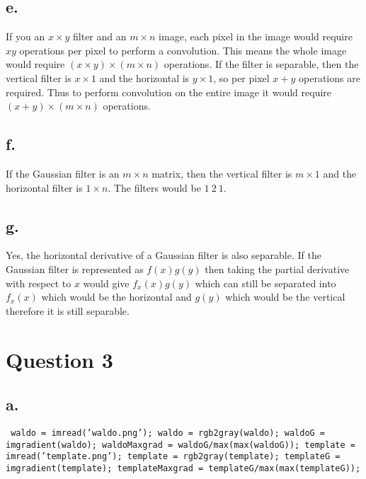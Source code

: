 \documentclass{article}
\begin{document}
\newpage
\subsection*{e.}
If you an $x \times y$ filter and an $m \times n$ image, each pixel in the image would require $xy$ operations per pixel to perform a convolution. This means the whole image would require $(x\times y) \times (m \times n) $ operations. If the filter is separable, then the vertical filter is $x \times 1$ and the horizontal is $y \times 1$, so per pixel $x+y$ operations are required. Thus to perform convolution on the entire image it would require $(x + y) \times (m \times n)$ operations.

\subsection*{f.}
If the Gaussian filter is an $m \times n$ matrix, then the vertical filter is $m \times 1$ and the horizontal filter is $1 \times n$. The filters would be $1\ 2\ 1$.

\subsection*{g.}
Yes, the horizontal derivative of a Gaussian filter is also separable. If the Gaussian filter is represented as $f(x)g(y)$ then taking the partial derivative with respect to $x$ would give $f_{x}(x)g(y)$ which can still be separated into $f_{x}(x)$ which would be the horizontal and $g(y)$ which would be the vertical therefore it is still separable.

\newpage
\section*{Question 3}
\subsection*{a.}
\texttt{
\newline\noindent
waldo = imread('waldo.png');
\newline
waldo = rgb2gray(waldo);
\newline
waldoG = imgradient(waldo);
\newline
waldoMaxgrad =  waldoG/max(max(waldoG));
\newline\newline
template = imread('template.png');
\newline
template = rgb2gray(template);
\newline
templateG = imgradient(template);
\newline
templateMaxgrad =  templateG/max(max(templateG));
}
\end{document}
